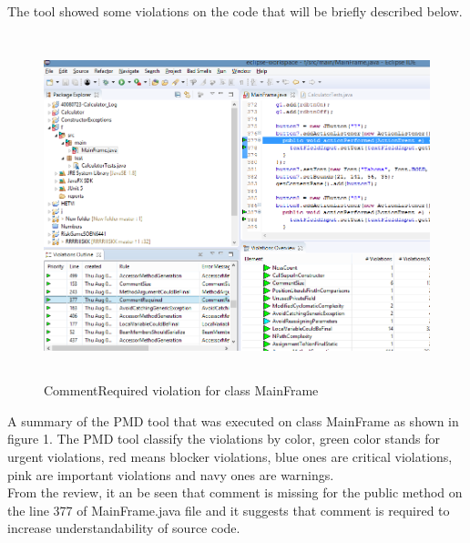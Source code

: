 \documentclass[12pt]{report}
\begin{document}
{The tool showed some violations on the code that will be briefly described below.

\begin{figure}[h!]
    \includegraphics[width=16cm, height=10cm]{Image/automaticReview1.png}
    \caption{CommentRequired violation for class MainFrame}
\end{figure}
\clearpage
\indent A summary of the PMD tool that was executed on class MainFrame as shown in figure 1. The PMD tool classify the violations by color, green color stands for urgent violations, red means blocker violations, blue ones are critical violations, pink are important violations and navy ones are warnings.
\newline\\From the review, it an be seen that comment is missing for the public method on the line 377 of MainFrame.java file and it suggests that comment is required to increase understandability of source code.
\newline

}
\end{document}
